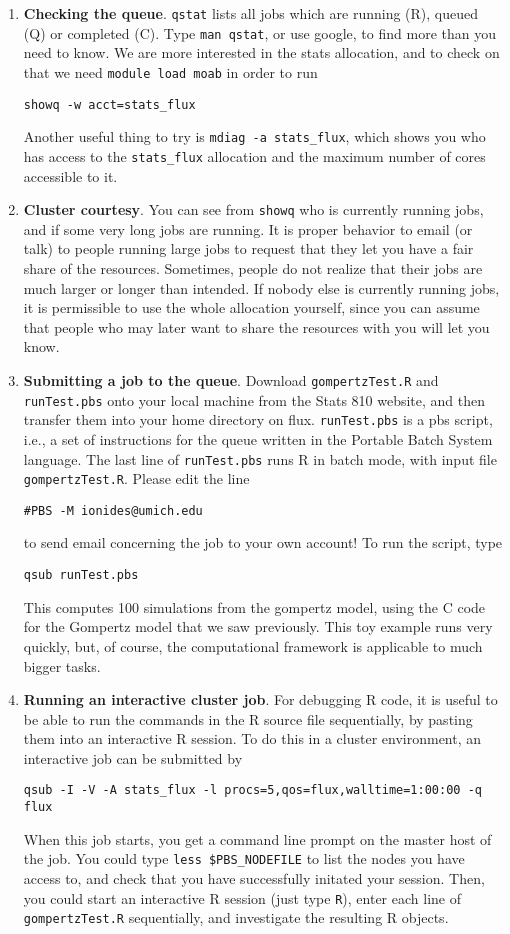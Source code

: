 \documentclass[12pt]{article}
\begin{document}
\begin{enumerate}
\item {\bf Checking the queue}. \texttt{qstat} lists all jobs which are running (R), queued (Q) or completed (C). Type \texttt{man qstat}, or use google, to find more than you need to know. We are more interested in the stats allocation, and to check on that we need \texttt{module load moab} in order to run
\begin{verbatim}
showq -w acct=stats_flux
\end{verbatim}
Another useful thing to try is \verb|mdiag -a stats_flux|, which shows you who has access to the \verb|stats_flux| allocation and the maximum number of cores accessible to it. 
\item {\bf Cluster courtesy}. You can see from \texttt{showq} who is currently running jobs, and if some very long jobs are running. It is proper behavior to email (or talk) to people running large jobs to request that they let you have a fair share of the resources. Sometimes, people do not realize that their jobs are much larger or longer than intended. If nobody else is currently running jobs, it is permissible to use the whole allocation yourself, since you can assume that people who may later want to share the resources with you will let you know.

\item {\bf Submitting a job to the queue}. Download \texttt{gompertzTest.R} and \texttt{runTest.pbs} onto your local machine from the Stats 810 website, and then transfer them into your home directory on flux.  \texttt{runTest.pbs} is a pbs script, i.e., a set of instructions for the queue written in the Portable Batch System language. The last line of \texttt{runTest.pbs} runs R in batch mode, with input file \texttt{gompertzTest.R}. Please edit the line 
\begin{verbatim}
#PBS -M ionides@umich.edu
\end{verbatim}
to send email concerning the job to your own account! To run the script, type
\begin{verbatim}
qsub runTest.pbs
\end{verbatim}
This computes 100 simulations from the gompertz model, using the C code for the Gompertz model that we saw previously. This toy example runs very quickly, but, of course, the computational framework is applicable to much bigger tasks.

\item {\bf Running an interactive cluster job}. For debugging R code, it is useful to be able to run the commands in the R source file sequentially, by pasting them into an interactive R session. To do this in a cluster environment, an interactive job can be submitted by 
\begin{verbatim}
qsub -I -V -A stats_flux -l procs=5,qos=flux,walltime=1:00:00 -q flux
\end{verbatim}
When this job starts, you get a command line prompt on the master host of the job. You could type \verb|less $PBS_NODEFILE| to list the nodes you have access to, and check that you have successfully initated your session. Then, you could start an interactive R session (just type \texttt{R}), enter each line of \texttt{gompertzTest.R} sequentially, and investigate the resulting R objects.


\end{enumerate}
\end{document}
